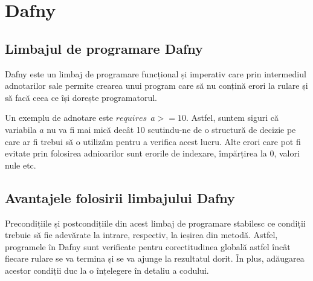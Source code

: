 \chapter{Dafny}

\section{Limbajul de programare Dafny}
Dafny este un limbaj de programare funcțional și imperativ care prin intermediul adnotarilor sale permite crearea unui program care să nu conțină erori la rulare și să facă ceea ce își dorește programatorul.\par
Un exemplu de adnotare este $ requires \ \ a >= 10 $. Astfel, suntem siguri că variabila $a$ nu va fi mai mică decât 10 scutindu-ne de o structură de decizie pe care ar fi trebui să o utilizăm pentru a verifica acest lucru. Alte erori care pot fi evitate prin folosirea adnioarilor sunt erorile de indexare, împărțirea la 0, valori nule etc.
\par 


\section{Avantajele folosirii limbajului Dafny}
Precondițiile și postcondițiile din acest limbaj de programare stabilesc ce condiții trebuie să fie adevărate la intrare, respectiv, la ieșirea din metodă. Astfel, programele în Dafny sunt verificate pentru corectitudinea globală astfel încât fiecare rulare se va termina și se va ajunge la rezultatul dorit.
În plus, adăugarea acestor condiții duc la o înțelegere în detaliu a codului. 





